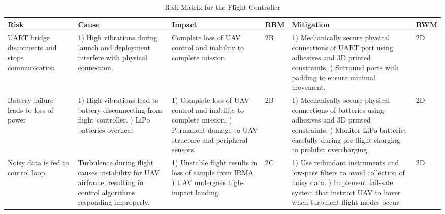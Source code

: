         \begin{table}[H]
            \label{Flight Controller}
            {\footnotesize
            \caption{Risk Matrix for the Flight Controller}
            \centering
            \begin{tabularx}{\linewidth}{XXXlXl}
            \toprule
            \textbf{Risk}                                            & \textbf{Cause}                                                                                                                 & \textbf{Impact}                                                                                                                           & \textbf{RBM}  & \textbf{Mitigation}                                                                                                                                                                                     & \textbf{RWM} \\
            \midrule
            UART bridge disconnects and stops communication & 1) High vibrations during launch and deployment interfere with physical connection.                                  & Complete loss of UAV control and inability to complete mission.                                                                 & \cellcolor{red!25} 2B  & 1) Mechanically secure physical connections of UART port using adhesives and 3D printed constraints. \newline 2) Surround ports with padding to ensure minimal movement.                               & \cellcolor{orange!25} 2D  \\
            Battery failure leads to loss of power          & 1) High vibrations lead to battery disconnecting from flight controller. \newline 2) LiPo batteries overheat                   & 1) Complete loss of UAV control and inability to complete mission. \newline 2) Permanent damage to UAV structure and peripheral sensors. & \cellcolor{red!25} 2B  & 1) Mechanically secure physical connections of batteries using adhesives and 3D printed constraints. \newline 2) Monitor LiPo batteries carefully during pre-flight charging to prohibit overcharging. & \cellcolor{orange!25} 2D  \\
            Noisy data is fed to control loop.              & Turbulence during flight causes instability for UAV airframe, resulting in control algorithms responding improperly. & 1) Unstable flight results in loss of sample from IRMA. \newline 2) UAV undergoes high-impact landing.                                & \cellcolor{orange!25} 2C  & 1) Use redundant instruments and low-pass filters to avoid collection of noisy data. \newline 2) Implement fail-safe system that instruct UAV to hover when turbulent flight modes occur.              & \cellcolor{orange!25} 2D \\
            \bottomrule
            \end{tabularx}
            }
        \end{table}
